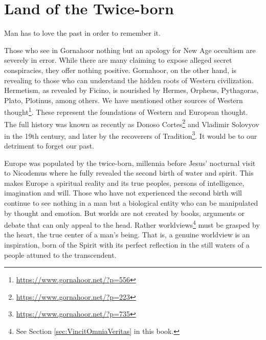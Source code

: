 \section{Land of the Twice-born}

\begin{quotex}
Man has to love the past in order to remember it.
\end{quotex}


Those who see in Gornahoor nothing but an apology for New Age occultism are severely in error. While there are many claiming to expose alleged secret conspiracies, they offer nothing positive. Gornahoor, on the other hand, is revealing to those who can understand the hidden roots of Western civilization. Hermetism, as revealed by Ficino, is nourished by Hermes, Orpheus, Pythagoras, Plato, Plotinus, among others. We have mentioned other sources of Western thought\footnote{\url{https://www.gornahoor.net/?p=556}}. These represent the foundations of Western and European thought. The full history was known as recently as Donoso Cortes\footnote{\url{https://www.gornahoor.net/?p=223}} and Vladimir Solovyov in the 19th century, and later by the recoverers of Tradition\footnote{\url{https://www.gornahoor.net/?p=735}}. It would be to our detriment to forget our past.

Europe was populated by the twice-born, millennia before Jesus' nocturnal visit to Nicodemus where he fully revealed the second birth of water and spirit. This makes Europe a spiritual reality and its true peoples, persons of intelligence, imagination and will. Those who have not experienced the second birth will continue to see nothing in a man but a biological entity who can be manipulated by thought and emotion. But worlds are not created by books, arguments or debate that can only appeal to the head. Rather worldviews\footnote{See Section \ref{sec:VincitOmniaVeritas} in this book.} must be grasped by the heart, the true center of a man's being. That is, a genuine worldview is an inspiration, born of the Spirit with its perfect reflection in the still waters of a people attuned to the transcendent.



